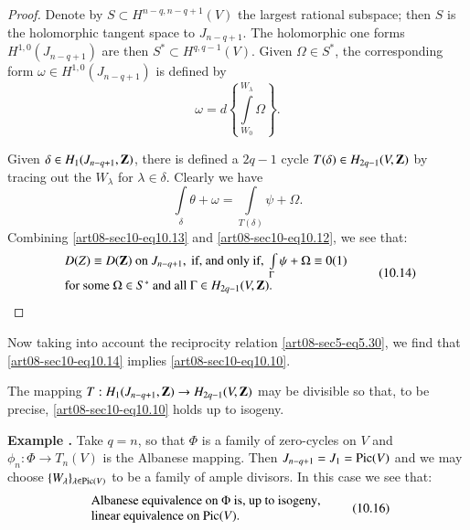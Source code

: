 \begin{proof}
Denote by $S\subset H^{n-q,n-q+1}(V)$ the largest rational subspace; then $S$ is the holomorphic tangent space to $J_{n-q+1}$. The holomorphic one forms $H^{1,0}(J_{n-q+1})$ are then $S^{*}\subset H^{q,q-1}(V)$. Given $\Omega\in S^{*}$, the corresponding form $\omega\in H^{1,0}(J_{n-q+1})$ is defined by
$$
\omega= d\left\{\int\limits^{W_{\lambda}}_{W_{0}}\Omega\right\}.
$$

Given $\delta\in H_{1}(J_{n-q+1},\mathbf{Z})$, there is defined a $2q-1$ cycle $T(\delta)\in H_{2q-1}(V,\mathbf{Z})$ by tracing out the $W_{\lambda}$ for $\lambda\in \delta$. Clearly we have
\begin{equation*}
\int\limits_{\delta}\theta+\omega=\int\limits_{T(\delta)}\psi+\Omega.\tag{10.13}\label{art08-sec10-eq10.13}
\end{equation*}
Combining \eqref{art08-sec10-eq10.13} and \eqref{art08-sec10-eq10.12}, we see that:
\begin{equation*}
\begin{array}{l}
D(Z)\equiv D(\mathbf{Z})\text{ on } J_{n-q+1},\text{ if, and only if, } \int\limits_{\Gamma}\psi+\Omega\equiv 0(1)\\
\text{for some } \Omega\in S^{*} \text{ and all } \Gamma\in H_{2q-1}(V,\mathbf{Z}).
\end{array}\tag{10.14}\label{art08-sec10-eq10.14}
\end{equation*}
\end{proof}

Now taking into account the reciprocity relation \eqref{art08-sec5-eq5.30}, we find that \eqref{art08-sec10-eq10.14} implies \eqref{art08-sec10-eq10.10}.

\begin{remark*}
The mapping $T:H_{1}(J_{n-q+1},\mathbf{Z})\to H_{2q-1}(V,\mathbf{Z})$ may be divisible so that, to be precise, \eqref{art08-sec10-eq10.10} holds up to isogeny.
\end{remark*}

\noindent
{\bf Example .\label{art08-sec10-exam10.15}}
Take $q=n$, so that $\Phi$ is a family of zero-cycles on $V$ and $\phi_{n}:\Phi\to T_{n}(V)$ is the Albanese mapping. Then $J_{n-q+1}=J_{1}=\operatorname{\mathrm{Pic}}(V)$ and we may choose $\{W_{\lambda}\}_{\lambda\in \operatorname{\mathrm{Pic}}(V)}$ to be a family of ample divisors. In this case we see that:
\begin{equation*}
\begin{array}{l}
\text{Albanese equivalence on $\Phi$ is, up to isogeny},\\
\text{linear equivalence on $\operatorname{\mathrm{Pic}}(V)$.}
\end{array}\tag{10.16}\label{art08-sec10-eq10.16}
\end{equation*}

